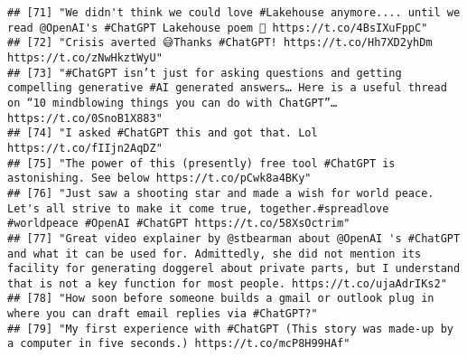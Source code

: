 \documentclass[
]{article}
\begin{document}
\begin{verbatim}
## [71] "We didn't think we could love #Lakehouse anymore.... until we read @OpenAI's #ChatGPT Lakehouse poem 🥺 https://t.co/4BsIXuFppC"                                                                                                                                                                               
## [72] "Crisis averted 😅Thanks #ChatGPT! https://t.co/Hh7XD2yhDm https://t.co/zNwHkztWyU"                                                                                                                                                                                                                             
## [73] "#ChatGPT isn’t just for asking questions and getting compelling generative #AI generated answers… Here is a useful thread on “10 mindblowing things you can do with ChatGPT”… https://t.co/0SnoB1X883"                                                                                                         
## [74] "I asked #ChatGPT this and got that. Lol https://t.co/fIIjn2AqDZ"                                                                                                                                                                                                                                               
## [75] "The power of this (presently) free tool #ChatGPT is astonishing. See below https://t.co/pCwk8a4BKy"                                                                                                                                                                                                            
## [76] "Just saw a shooting star and made a wish for world peace. Let's all strive to make it come true, together.#spreadlove #worldpeace #OpenAI #ChatGPT https://t.co/58XsOctrim"                                                                                                                                    
## [77] "Great video explainer by @stbearman about @OpenAI 's #ChatGPT and what it can be used for. Admittedly, she did not mention its facility for generating doggerel about private parts, but I understand that is not a key function for most people. https://t.co/ujaAdrIKs2"                                     
## [78] "How soon before someone builds a gmail or outlook plug in where you can draft email replies via #ChatGPT?"                                                                                                                                                                                                     
## [79] "My first experience with #ChatGPT (This story was made-up by a computer in five seconds.) https://t.co/mcP8H99HAf"                                                                                                                                                                                             

\end{verbatim}
\end{document}
